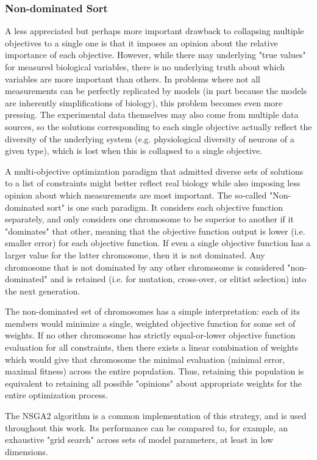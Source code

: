 \subsubsection{Non-dominated Sort} A less appreciated but perhaps more important drawback to collapsing multiple objectives to a single one is that it imposes an opinion about the relative importance of each objective.
However, while there may underlying "true values" for measured biological variables, there is no underlying truth about which variables are more important than others.
In problems where not all measurements can be perfectly replicated by models (in part because the models are inherently simplifications of biology), this problem becomes even more pressing.
The experimental data themselves may also come from multiple data sources, so the solutions corresponding to each single objective actually reflect the diversity of the underlying system (e.g. physiological diversity of neurons of a given type), which is lost when this is collapsed to a single objective.

A multi-objective optimization paradigm that admitted diverse sets of solutions to a list of constraints might better reflect real biology while also imposing less opinion about which measurements are most important.
The so-called "Non-dominated sort" is one such paradigm.
It considers each objective function separately, and only considers one chromosome to be superior to another if it "dominates" that other, meaning that the objective function output is lower (i.e. smaller error) for each objective function.
If even a single objective function has a larger value for the latter chromosome, then it is not dominated.  Any chromosome that is not dominated by any other chromosome is considered "non-dominated" and is retained (i.e. for mutation, cross-over, or elitist selection) into the next generation.

The non-dominated set of chromosomes has a simple interpretation: each of its members would minimize a single, weighted objective function for some set of weights.
If no other chromosome has strictly equal-or-lower objective function evaluation for all constraints, then there exists a linear combination of weights which would give that chromosome the minimal evaluation (minimal error, maximal fitness) across the entire population.
Thus, retaining this population is equivalent to retaining all possible "opinions" about appropriate weights for the entire optimization process.

The NSGA2 algorithm \cite{deb2000fast} is a common implementation of this strategy, and is used throughout this work.  Its performance can be compared to, for example, an exhaustive "grid search" across sets of model parameters, at least in low dimensions.  

